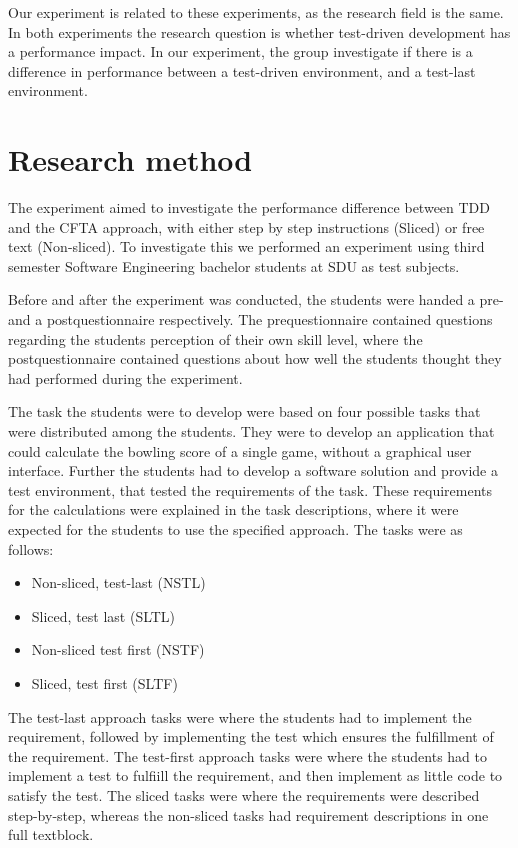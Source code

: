 \documentclass{sig-alternate-05-2015}
\begin{document}
Our experiment is related to these experiments, as the research field is the same. In both experiments \cite{fucci1, fucci2} the research question is whether test-driven development has a performance impact. In our experiment, the group investigate if there is a difference in performance between a test-driven environment, and a test-last environment.

\section{Research method}
The experiment aimed to investigate the performance difference between TDD and the CFTA approach, with either step by step instructions (Sliced) or free text (Non-sliced). To investigate this we performed an experiment using third semester Software Engineering bachelor students at SDU as test subjects.

Before and after the experiment was conducted, the students were handed a pre- and a postquestionnaire respectively.
The prequestionnaire contained questions regarding the students perception of their own skill level, where the postquestionnaire contained questions about how well the students thought they had performed during the experiment.

The task the students were to develop were based on four possible tasks that were distributed among the students. They were to develop an application that could calculate the bow\-ling score of a single game, without a graphical user interface. Further the students had to develop a software solution and provide a test environment, that tested the requirements of the task. These requirements for the calculations were explained in the task descriptions, where it were expected for the students to use the specified approach.
The tasks were as follows:
\begin{itemize}
	\item Non-sliced, test-last (NSTL)
	\item Sliced, test last (SLTL)
	\item Non-sliced test first (NSTF)
	\item Sliced, test first (SLTF)
\end{itemize}
The test-last approach tasks were where the students had to implement the requirement, followed by implementing the test which ensures the fulfillment of the requirement.
The test-first approach tasks were where the students had to implement a test to fulfiill the requirement, and then implement as little code to satisfy the test.
The sliced tasks were where the requirements were described step-by-step, whereas the non-sliced tasks had requirement descriptions in one full textblock.
\end{document}
